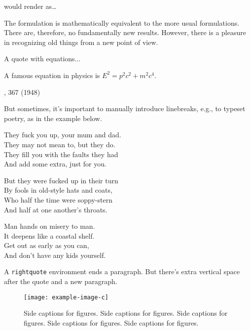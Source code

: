 \documentclass{article}
\begin{document}
\noindent would render as\ldots

\begin{rightquote}
The formulation is mathematically
equivalent to the more usual
formulations.  There are, therefore, no
fundamentally new results.  However,
there is a pleasure in recognizing old
things from a new point of view.

\par
\end{rightquote}

A quote with equations...

\begin{rightquote}
  A famous equation in physics is $E^{2} = p^{2}{c}^{2} + m^{2}c^{4}$.

  , 367 (1948)\par
\end{rightquote}


But sometimes, it's important to manually introduce linebreaks, e.g., to typeset poetry, as in the example below.

\begin{rightquote}
They fuck you up, your mum and dad.\\
  They may not mean to, but they do.\\
They fill you with the faults they had\\
  And add some extra, just for you.

But they were fucked up in their turn\\
  By fools in old-style hats and coats,\\
Who half the time were soppy-stern\\
  And half at one another's throats.

Man hands on misery to man.\\
  It deepens like a coastal shelf.\\
Get out as early as you can,\\
  And don't have any kids yourself.

\end{rightquote}\par

A \verb|rightquote| environment ends a paragraph.
But there's extra vertical space after the quote and a new paragraph.

\begin{SCfigure}
  \texttt{[image: example-image-c]}
  \caption{Side captions for figures.
Side captions for figures.
Side captions for figures.
Side captions for figures.
Side captions for figures.}
\end{SCfigure}
\end{document}

